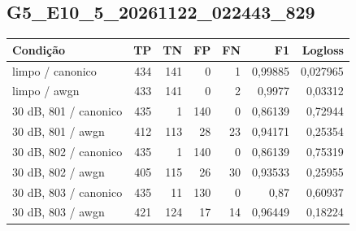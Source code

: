 \subsection{G5\_E10\_5\_20261122\_022443\_829}
\small\begin{longtable}{@{}p{.38\linewidth}rrrrrr@{}}
\toprule Condição & TP & TN & FP & FN & F1 & Logloss\\\midrule\endhead
limpo /\allowbreak{} canonico & 434 & 141 & 0 & 1 & 0,99885 & 0,027965\\
limpo /\allowbreak{} awgn & 433 & 141 & 0 & 2 & 0,9977 & 0,03312\\
30 dB, 801 /\allowbreak{} canonico & 435 & 1 & 140 & 0 & 0,86139 & 0,72944\\
30 dB, 801 /\allowbreak{} awgn & 412 & 113 & 28 & 23 & 0,94171 & 0,25354\\
30 dB, 802 /\allowbreak{} canonico & 435 & 1 & 140 & 0 & 0,86139 & 0,75319\\
30 dB, 802 /\allowbreak{} awgn & 405 & 115 & 26 & 30 & 0,93533 & 0,25955\\
30 dB, 803 /\allowbreak{} canonico & 435 & 11 & 130 & 0 & 0,87 & 0,60937\\
30 dB, 803 /\allowbreak{} awgn & 421 & 124 & 17 & 14 & 0,96449 & 0,18224\\
\bottomrule\end{longtable}\normalsize

